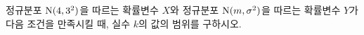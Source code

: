 정규분포 $\mathrm{N}(4{,}\mkern3mu\mathopen{}3^2)$을 따르는 확률변수 $X$와 정규분포 $\mathrm{N}(m{,}\mkern3mu\mathopen{}\sigma^2)$을 따르는 확률변수 $Y$가 다음 조건을 만족시킬 때, 실수 $k$의 값의 범위를 구하시오. 
